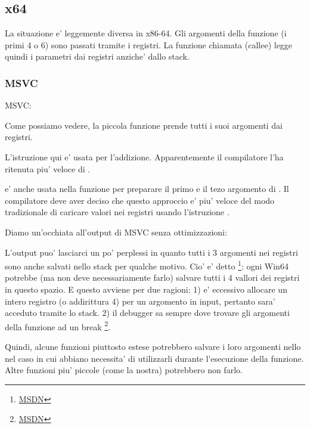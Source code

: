 \subsection{x64}


La situazione e' leggemente diversa in x86-64. Gli argomenti della funzione (i primi 4 o 6) 
sono passati tramite i registri. La funzione chiamata (\gls{callee}) legge quindi i parametri dai registri anziche' dallo stack.

\subsubsection{MSVC}

\Optimizing MSVC:



Come possiamo vedere, la piccola funzione \ttf prende tutti i suoi argomenti dai registri.

L'istruzione \LEA qui e' usata per l'addizione. Apparentemente il compilatore l'ha ritenuta piu' veloce di .

\LEA e' anche usata nella funzione \main per preparare il primo e il tezo argomento di \ttf.
Il compilatore deve aver deciso che questo approccio e' piu' veloce del modo tradizionale di caricare valori nei registri usando l'istruzione \MOV.

Diamo un'occhiata all'output di MSVC senza ottimizzazioni:



L'output puo' lasciarci un po' perplessi in quanto tutti i 3 argomenti nei registri sono anche salvati nello stack per qualche motivo. 
\label{shadow_space}
Cio' e' detto 
\footnote{\href{http://go.yurichev.com/17256}{MSDN}}: 
ogni Win64 potrebbe (ma non deve necessariamente farlo) salvare tutti i 4 vallori dei registri in questo spazio.
E questo avviene per due ragioni: 
1) e' eccessivo allocare un intero registro (o addirittura 4) per un argomento in input, pertanto sara' acceduto tramite lo stack.
2) il debugger sa sempre dove trovare gli argomenti della funzione ad un break
\footnote{\href{http://go.yurichev.com/17257}{MSDN}}.

Quindi, alcune funzioni piuttosto estese potrebbero salvare i loro argomenti nello  nel caso in cui 
abbiano necessita' di utilizzarli durante l'esecuzione della funzione. Altre funzioni piu' piccole (come la nostra) potrebbero non farlo.


